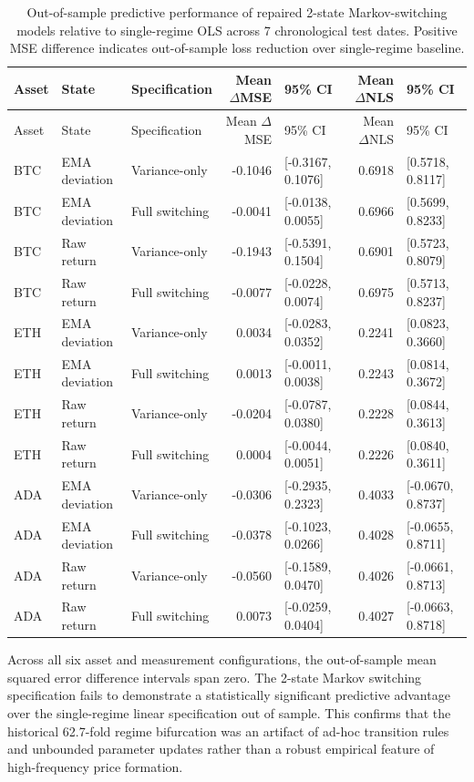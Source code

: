 {\footnotesize
\begin{longtable}{lllrlrl}
\caption{Out-of-sample predictive performance of repaired 2-state Markov-switching models relative to single-regime OLS across 7 chronological test dates. Positive MSE difference indicates out-of-sample loss reduction over single-regime baseline.}\label{tab:regime_market_rebuilt}\\
\toprule Asset & State & Specification & Mean $\Delta$MSE & 95\% CI & Mean $\Delta$NLS & 95\% CI\\\midrule\endfirsthead
\toprule Asset & State & Specification & Mean $\Delta$MSE & 95\% CI & Mean $\Delta$NLS & 95\% CI\\\midrule\endhead
\bottomrule\endfoot
BTC & EMA deviation & Variance-only & -0.1046 & [-0.3167, 0.1076] & 0.6918 & [0.5718, 0.8117]\\
BTC & EMA deviation & Full switching & -0.0041 & [-0.0138, 0.0055] & 0.6966 & [0.5699, 0.8233]\\
BTC & Raw return & Variance-only & -0.1943 & [-0.5391, 0.1504] & 0.6901 & [0.5723, 0.8079]\\
BTC & Raw return & Full switching & -0.0077 & [-0.0228, 0.0074] & 0.6975 & [0.5713, 0.8237]\\
ETH & EMA deviation & Variance-only & 0.0034 & [-0.0283, 0.0352] & 0.2241 & [0.0823, 0.3660]\\
ETH & EMA deviation & Full switching & 0.0013 & [-0.0011, 0.0038] & 0.2243 & [0.0814, 0.3672]\\
ETH & Raw return & Variance-only & -0.0204 & [-0.0787, 0.0380] & 0.2228 & [0.0844, 0.3613]\\
ETH & Raw return & Full switching & 0.0004 & [-0.0044, 0.0051] & 0.2226 & [0.0840, 0.3611]\\
ADA & EMA deviation & Variance-only & -0.0306 & [-0.2935, 0.2323] & 0.4033 & [-0.0670, 0.8737]\\
ADA & EMA deviation & Full switching & -0.0378 & [-0.1023, 0.0266] & 0.4028 & [-0.0655, 0.8711]\\
ADA & Raw return & Variance-only & -0.0560 & [-0.1589, 0.0470] & 0.4026 & [-0.0661, 0.8713]\\
ADA & Raw return & Full switching & 0.0073 & [-0.0259, 0.0404] & 0.4027 & [-0.0663, 0.8718]\\
\end{longtable}
}

Across all six asset and measurement configurations, the out-of-sample mean squared error difference intervals span zero. The 2-state Markov switching specification fails to demonstrate a statistically significant predictive advantage over the single-regime linear specification out of sample. This confirms that the historical 62.7-fold regime bifurcation was an artifact of ad-hoc transition rules and unbounded parameter updates rather than a robust empirical feature of high-frequency price formation.

